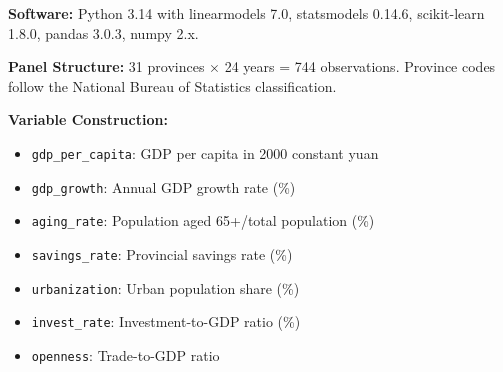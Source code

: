 \documentclass[12pt]{article}
\begin{document}
\textbf{Software:} Python 3.14 with linearmodels 7.0, statsmodels 0.14.6, scikit-learn 1.8.0, pandas 3.0.3, numpy 2.x.

\textbf{Panel Structure:} 31 provinces $\times$ 24 years = 744 observations. Province codes follow the National Bureau of Statistics classification.

\textbf{Variable Construction:}
\begin{itemize}
    \item \texttt{gdp\_per\_capita}: GDP per capita in 2000 constant yuan
    \item \texttt{gdp\_growth}: Annual GDP growth rate (\%)
    \item \texttt{aging\_rate}: Population aged 65+/total population (\%)
    \item \texttt{savings\_rate}: Provincial savings rate (\%)
    \item \texttt{urbanization}: Urban population share (\%)
    \item \texttt{invest\_rate}: Investment-to-GDP ratio (\%)
    \item \texttt{openness}: Trade-to-GDP ratio
\end{itemize}
\end{document}
